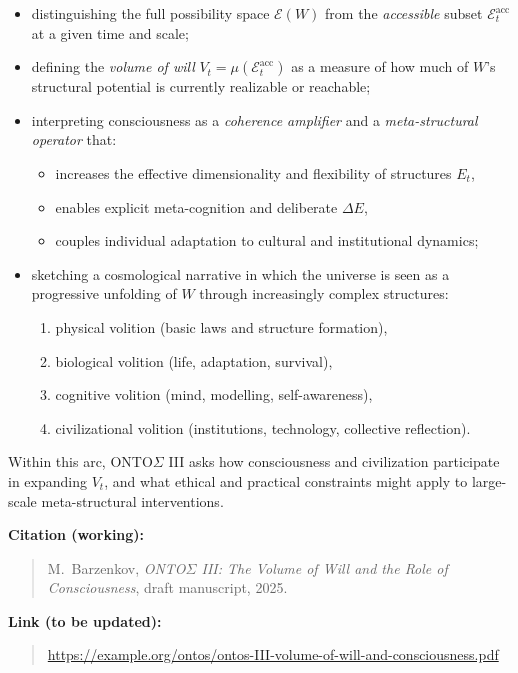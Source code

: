 \documentclass[12pt,a4paper]{report}
\newcommand{\Will}{W}
\begin{document}
\begin{itemize}[leftmargin=2em]
    \item distinguishing the full possibility space \(\mathcal{E}(\Will)\) from the \emph{accessible} subset \(\mathcal{E}_t^{\mathrm{acc}}\) at a given time and scale;
    \item defining the \emph{volume of will} \(V_t = \mu(\mathcal{E}_t^{\mathrm{acc}})\) as a measure of how much of \(\Will\)'s structural potential is currently realizable or reachable;
    \item interpreting consciousness as a \emph{coherence amplifier} and a \emph{meta-structural operator} that:
    \begin{itemize}
        \item increases the effective dimensionality and flexibility of structures \(E_t\),
        \item enables explicit meta-cognition and deliberate $\Delta E$,
        \item couples individual adaptation to cultural and institutional dynamics;
    \end{itemize}
    \item sketching a cosmological narrative in which the universe is seen as a progressive unfolding of \(\Will\) through increasingly complex structures:
    \begin{enumerate}
        \item physical volition (basic laws and structure formation),
        \item biological volition (life, adaptation, survival),
        \item cognitive volition (mind, modelling, self-awareness),
        \item civilizational volition (institutions, technology, collective reflection).
    \end{enumerate}
\end{itemize}

Within this arc, ONTO$\Sigma$ III asks how consciousness and civilization participate in expanding \(V_t\), and what ethical and practical constraints might apply to large-scale meta-structural interventions.

\noindent\textbf{Citation (working):}
\begin{quote}
M.\ Barzenkov, \emph{ONTO$\Sigma$ III: The Volume of Will and the Role of Consciousness}, draft manuscript, 2025.
\end{quote}

\noindent\textbf{Link (to be updated):}
\begin{quote}
\url{https://example.org/ontos/ontos-III-volume-of-will-and-consciousness.pdf}
\end{quote}


\nocite{*}


\clearpage
\end{document}

